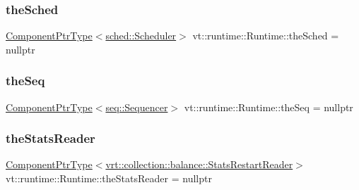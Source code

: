 \mbox{\label{structvt_1_1runtime_1_1_runtime_ae9d0dc11ee40a455a64982eec66e3a26}} 
\subsubsection{\texorpdfstring{the\+Sched}{theSched}}
{\footnotesize\ttfamily \hyperlink{structvt_1_1runtime_1_1_runtime_a0893bf0a8c03b898e8ab66b52cec80ad}{Component\+Ptr\+Type}$<$\hyperlink{structvt_1_1sched_1_1_scheduler}{sched\+::\+Scheduler}$>$ vt\+::runtime\+::\+Runtime\+::the\+Sched = nullptr}

\mbox{\label{structvt_1_1runtime_1_1_runtime_a02ad54cc65d06e4cf2dbc0cbfd2c9721}} 
\subsubsection{\texorpdfstring{the\+Seq}{theSeq}}
{\footnotesize\ttfamily \hyperlink{structvt_1_1runtime_1_1_runtime_a0893bf0a8c03b898e8ab66b52cec80ad}{Component\+Ptr\+Type}$<$\hyperlink{structvt_1_1seq_1_1_sequencer}{seq\+::\+Sequencer}$>$ vt\+::runtime\+::\+Runtime\+::the\+Seq = nullptr}

\mbox{\label{structvt_1_1runtime_1_1_runtime_ada50802f68607a89f9a268cf1a021926}} 
\subsubsection{\texorpdfstring{the\+Stats\+Reader}{theStatsReader}}
{\footnotesize\ttfamily \hyperlink{structvt_1_1runtime_1_1_runtime_a0893bf0a8c03b898e8ab66b52cec80ad}{Component\+Ptr\+Type}$<$\hyperlink{structvt_1_1vrt_1_1collection_1_1balance_1_1_stats_restart_reader}{vrt\+::collection\+::balance\+::\+Stats\+Restart\+Reader}$>$ vt\+::runtime\+::\+Runtime\+::the\+Stats\+Reader = nullptr}


